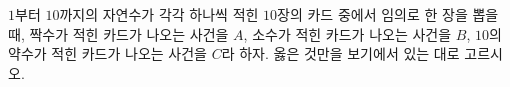 $1$부터 $10$까지의 자연수가 각각 하나씩 적힌 $10$장의 카드 중에서 임의로 한 장을 뽑을 때, 짝수가 적힌 카드가 나오는 사건을 $A$, 소수가 적힌 카드가 나오는 사건을 $B$, $10$의 약수가 적힌 카드가 나오는 사건을 $C$라 하자. 옳은 것만을 보기에서 있는 대로 고르시오. 
